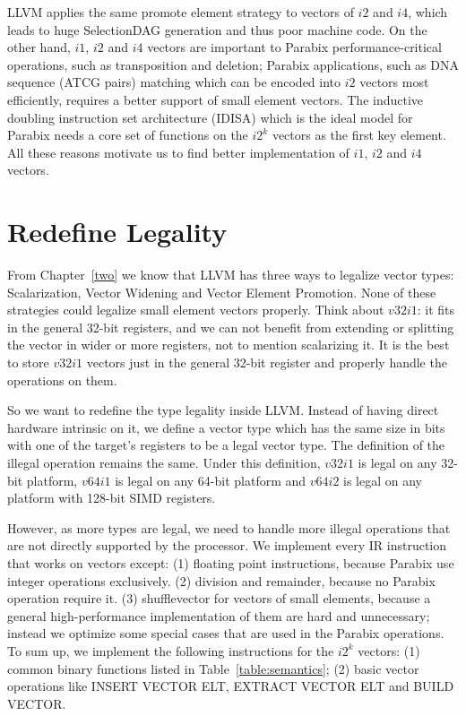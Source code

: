 LLVM applies the same promote element strategy to vectors of $i2$ and $i4$, which leads to huge SelectionDAG generation and thus poor machine code. On the other hand, $i1$, $i2$ and $i4$ vectors are important to Parabix performance-critical operations, such as transposition and deletion; Parabix applications, such as DNA sequence (ATCG pairs) matching which can be encoded into $i2$ vectors most efficiently, requires a better support of small element vectors. The inductive doubling instruction set architecture (IDISA) which is the ideal model for Parabix needs a core set of functions on the $i2^k$ vectors as the first key element. All these reasons motivate us to find better implementation of $i1$, $i2$ and $i4$ vectors.

\section{Redefine Legality}

From Chapter~\ref{two} we know that LLVM has three ways to legalize vector types: Scalarization, Vector Widening and Vector Element Promotion. None of these strategies could legalize small element vectors properly. Think about $v32i1$: it fits in the general 32-bit registers, and we can not benefit from extending or splitting the vector in wider or more registers, not to mention scalarizing it. It is the best to store $v32i1$ vectors just in the general 32-bit register and properly handle the operations on them.

So we want to redefine the type legality inside LLVM\@. Instead of having direct hardware intrinsic on it, we define a vector type which has the same size in bits with one of the target's registers to be a legal vector type. The definition of the illegal operation remains the same. Under this definition, $v32i1$ is legal on any 32-bit platform, $v64i1$ is legal on any 64-bit platform and $v64i2$ is legal on any platform with 128-bit SIMD registers.

However, as more types are legal, we need to handle more illegal operations that are not directly supported by the processor. We implement every IR instruction that works on vectors except: (1) floating point instructions, because Parabix use integer operations exclusively. (2) division and remainder, because no Parabix operation require it. (3) shufflevector for vectors of small elements, because a general high-performance implementation of them are hard and unnecessary; instead we optimize some special cases that are used in the Parabix operations. To sum up, we implement the following instructions for the $i2^k$ vectors: (1) common binary functions listed in Table~\ref{table:semantics}; (2) basic vector operations like INSERT VECTOR ELT, EXTRACT VECTOR ELT and BUILD VECTOR\@.

